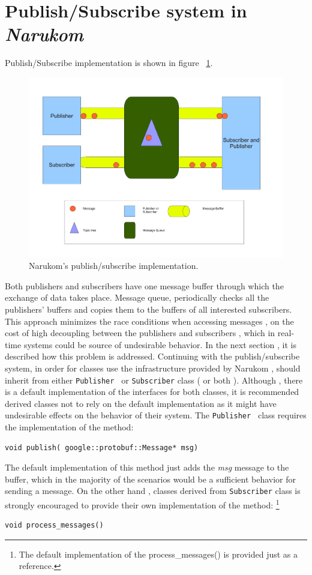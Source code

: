 \section{Publish/Subscribe system in \textit{Narukom} }
Publish/Subscribe implementation is shown in figure ~\ref{fig:Narukom-publish-subscribe}.



\begin{figure}[t]
\centering
  \includegraphics[width=0.9\columnwidth]{Chapter4/figures/publish_subscribe.pdf}
  \caption{Narukom's publish/subscribe implementation.} 
  \label{fig:Narukom-publish-subscribe}
\end{figure}
Both publishers and subscribers have one message buffer through which the exchange of data takes place. Message queue, periodically checks all the publishers'
buffers and copies them to the buffers of all interested subscribers. This approach minimizes the race conditions when accessing messages , on the cost of high
decoupling between the publishers and subscribers , which in real-time systems could be source of undesirable behavior. In the next section , it is described
how this problem is addressed. Continuing with the publish/subscribe system, in order for classes use the infrastructure provided by Narukom , should inherit
from either  {\tt Publisher } or {\tt Subscriber} class ( or both ). Although , there is a default implementation of the interfaces for both classes, it is
recommended  derived classes not to rely on the default implementation as it might have undesirable effects on the behavior of their system. The
 {\tt Publisher } class requires the implementation of the  method:
\begin{verbatim}
void publish( google::protobuf::Message* msg)
\end{verbatim}
The default implementation of this method just adds the \textit{msg} message to the buffer, which in the majority of the scenarios would be a sufficient
behavior for sending a message.
On the other hand , classes derived from {\tt Subscriber} class  is strongly encouraged to provide their own implementation of the  method: \footnote{The default implementation of the process\_messages() is provided just as a reference.}
\begin{verbatim}
void process_messages()
\end{verbatim}


